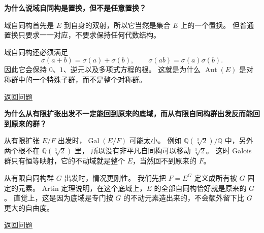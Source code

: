 \begin{exercise}\label{ex:ans-galois-automorphism-vs-permutation}
\hypertarget{ans:galois-automorphism-vs-permutation}{}
\textbf{为什么说域自同构是置换，但不是任意置换？}

域自同构首先是 $E$ 到自身的双射，所以它当然是集合 $E$ 上的一个置换。
但普通置换只要求一一对应，不要求保持任何代数结构。

域自同构还必须满足
\[
\sigma(a+b)=\sigma(a)+\sigma(b),\qquad \sigma(ab)=\sigma(a)\sigma(b).
\]
因此它会保持 $0$、$1$、逆元以及多项式方程的根。
这就是为什么 $\operatorname{Aut}(E)$ 是对称群中的一个特殊子群，而不是整个对称群。

\hyperlink{q:galois-automorphism-vs-permutation}{返回问题}
\end{exercise}

\begin{exercise}\label{ex:ans-galois-two-directions}
\hypertarget{ans:galois-two-directions}{}
\textbf{为什么从有限扩张出发不一定能回到原来的底域，而从有限自同构群出发反而能回到原来的群？}

从有限扩张 $E/F$ 出发时，$\operatorname{Gal}(E/F)$ 可能太小。
例如 $\mathbb{Q}(\sqrt[3]{2})/\mathbb{Q}$ 中，另外两个根不在 $\mathbb{Q}(\sqrt[3]{2})$ 里，
所以没有非平凡自同构可以移动 $\sqrt[3]{2}$。
这时 Galois 群只有恒等映射，它的不动域就是整个 $E$，当然回不到原来的 $F$。

从有限自同构群 $G$ 出发时，情况更刚性。
我们先把 $F=E^G$ 定义成所有被 $G$ 固定的元素。
Artin 定理说明，在这个底域上，$E$ 的全部自同构恰好就是原来的 $G$。
直觉上，这是因为底域是专门按 $G$ 的不动元素造出来的，不会额外留下比 $G$ 更大的自由度。

\hyperlink{q:galois-two-directions}{返回问题}
\end{exercise}
